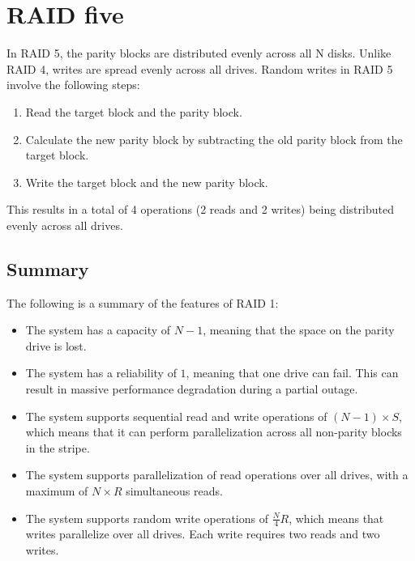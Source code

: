 \section{RAID five}

In RAID 5, the parity blocks are distributed evenly across all N disks. 
Unlike RAID 4, writes are spread evenly across all drives.
Random writes in RAID 5 involve the following steps:
\begin{enumerate}
    \item Read the target block and the parity block.
    \item Calculate the new parity block by subtracting the old parity block from the target block.
    \item Write the target block and the new parity block.
\end{enumerate}
This results in a total of 4 operations (2 reads and 2 writes) being distributed evenly across all drives.

\subsection{Summary}
The following is a summary of the features of RAID 1:
\begin{itemize}
    \item The system has a capacity of $N-1$, meaning that the space on the parity drive is lost. 
    \item The system has a reliability of $1$, meaning that one drive can fail. 
        This can result in massive performance degradation during a partial outage.
    \item The system supports sequential read and write operations of $(N-1)\times S$, which means that it can perform parallelization across all non-parity blocks in the stripe.
    \item The system supports parallelization of read operations over all drives, with a maximum of $N\times R$ simultaneous reads.
    \item The system supports random write operations of $\frac{N}{4}R$, which means that writes parallelize over all drives. 
        Each write requires two reads and two writes. 
\end{itemize}